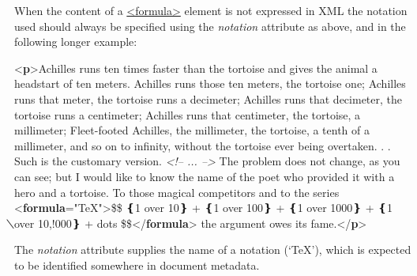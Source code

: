 When the content of a \hyperref[TEI.formula]{<formula>} element is not expressed in XML the notation used should always be specified using the {\itshape notation} attribute as above, and in the following longer example: \par\bgroup{}\exampleFont \begin{shaded}\noindent\mbox{}{<\textbf{p}>}Achilles runs ten times faster than the tortoise and gives the\mbox{}\newline 
 animal a headstart of ten meters. Achilles runs those ten meters, the\mbox{}\newline 
 tortoise one; Achilles runs that meter, the tortoise runs a decimeter;\mbox{}\newline 
 Achilles runs that decimeter, the tortoise runs a centimeter; Achilles\mbox{}\newline 
 runs that centimeter, the tortoise, a millimeter; Fleet-footed\mbox{}\newline 
 Achilles, the millimeter, the tortoise, a tenth of a millimeter, and\mbox{}\newline 
 so on to infinity, without the tortoise ever being overtaken. . . Such\mbox{}\newline 
 is the customary version. \mbox{}\newline 
\textit{<!-- ... -->} The problem does not change, as\mbox{}\newline 
 you can see; but I would like to know the name of the poet who\mbox{}\newline 
 provided it with a hero and a tortoise. To those magical competitors\mbox{}\newline 
 and to the series {<\textbf{formula}\hspace*{1em}{notation}="{TeX}">}\$\$ ❴1 ⃥over 10❵ + ❴1 ⃥over\mbox{}\newline 
\hspace*{1em}\hspace*{1em} 100❵ + ❴1 ⃥over 1000❵ + ❴1 ⃥over 10,⃥!000❵ + ⃥dots \$\${</\textbf{formula}>} the\mbox{}\newline 
 argument owes its fame.{</\textbf{p}>}\end{shaded}\egroup\par \noindent  The {\itshape notation} attribute supplies the name of a notation (‘TeX’), which is expected to be identified somewhere in document metadata.\par
